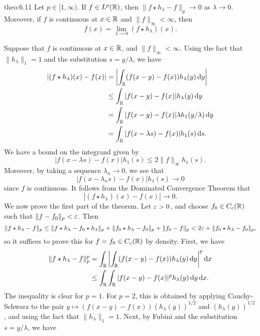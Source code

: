 \begin{theo}{theo:6.11}
    Let $p \in [1, \infty)$. If $f \in L^p(\mathbb{R})$, then 
    $\|f \star h_\lambda - f\|_p \to 0$ as $\lambda \to 0$. Moreover, if 
    $f$ is continuous at $x \in \mathbb{R}$ and $\|f\|_\infty < \infty$, then 
    \[ f(x) = \lim_{\lambda\to 0} (f \star h_\lambda)(x). \] 
\end{theo}
\begin{pf}
    Suppose that $f$ is continuous at $x \in \mathbb{R}$, and $\|f\|_\infty < \infty$. 
    Using the fact that $\|h_\lambda\|_1 = 1$ and the substitution 
    $s = y/\lambda$, we have  
    \begin{align*}
        |(f \star h_\lambda)(x) - f(x)| 
        &= \left| \int_{\mathbb{R}} (f(x-y) - f(x)) h_\lambda(y)\,\mathrm{d} y \right| \\
        &\leq \int_{\mathbb{R}} |f(x-y) - f(x)| h_\lambda(y) \,\mathrm{d} y \\ 
        &= \int_{\mathbb{R}} |f(x-y) - f(x)| \lambda h_1(y/\lambda) \,\mathrm{d} y \\ 
        &= \int_{\mathbb{R}} |f(x-\lambda s) - f(x)| h_1(s)\,\mathrm{d} s. 
    \end{align*}
    We have a bound on the integrand given by 
    \[ |f(x-\lambda s) - f(x)| h_1(s) \leq 2\|f\|_\infty h_1(s). \] 
    Moreover, by taking a sequence $\lambda_n \to 0$, we see that 
    \[ |f(x - \lambda_n s) - f(x)| h_1(s) \to 0 \] 
    since $f$ is continuous. It follows from the Dominated Convergence 
    Theorem that 
    \[ |(f \star h_\lambda)(x) - f(x)| \to 0. \] 
    We now prove the first part of the theorem. Let $\varepsilon > 0$, 
    and choose $f_0 \in C_c(\mathbb{R})$ such that $\|f - f_0\|_p < \varepsilon$. Then 
    \[ \|f \star h_\lambda - f\|_p \leq 
    \|f \star h_\lambda - f_0 \star h_\lambda\|_p + \|f_0 \star h_\lambda 
    - f_0\|_p + \|f_0 - f\|_p < 2\varepsilon + \|f_0 \star h_\lambda - f_0\|_p, \] 
    so it suffices to prove this for $f = f_0 \in C_c(\mathbb{R})$ by density. 
    First, we have 
    \begin{align*}
        \|f \star h_\lambda - f\|_p^p 
        &= \int_{\mathbb{R}} \left| \int_{\mathbb{R}} (f(x-y) - f(x)) h_\lambda(y) \,\mathrm{d} y 
        \right|^p \textrm{d}x \\ 
        &\leq \int_{\mathbb{R}} \int_{\mathbb{R}} |f(x-y) - f(x)|^p h_\lambda(y)\,\mathrm{d} y \,\mathrm{d} x. 
    \end{align*}
    The inequality is clear for $p = 1$. For $p = 2$, this is obtained by 
    applying Cauchy-Schwarz to the pair $y \mapsto (f(x-y) - f(x))(h_\lambda(y))^{1/2}$ 
    and $(h_\lambda(y))^{1/2}$, and using the fact that $\|h_\lambda\|_1 = 1$. 
    Next, by Fubini and the substitution $s = y/\lambda$, we have 

\end{pf}
